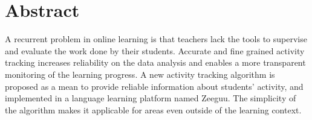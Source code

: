 \begingroup
\let\clearpage\relax
\let\cleardoublepage\relax
\let\cleardoublepage\relax

\chapter*{Abstract}
A recurrent problem in online learning is that teachers lack the tools to supervise and evaluate the work done by their students. Accurate and fine grained activity tracking increases reliability on the data analysis and enables a more transparent monitoring of the learning progress. A new activity tracking algorithm is proposed as a mean to provide reliable information about students' activity, and implemented in a language learning platform named Zeeguu. The simplicity of the algorithm makes it applicable for areas even outside of the learning context.




\vfill
%

\endgroup

\vfill
